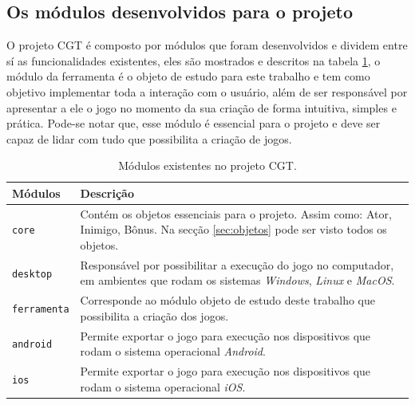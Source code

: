\documentclass[12pt,oneside,openright,a4paper,english,brazil,sumario=tradicional]{abntex2}
\begin{document}
\subsection{Os módulos desenvolvidos para o projeto}
O projeto CGT é composto por módulos que foram desenvolvidos e dividem entre sí as funcionalidades existentes, eles são mostrados e descritos na tabela \ref{table:modulos}, o módulo da ferramenta é o objeto de estudo para este trabalho e tem como objetivo implementar toda a interação com o usuário, além de ser responsável por apresentar a ele o jogo no momento da sua criação de forma intuitiva, simples e prática. Pode-se notar que, esse módulo é essencial para o projeto e deve ser capaz de lidar com tudo que possibilita a criação de jogos.
\begin{table}[h]
   \centering
   \begin{tabular}{ | l | p{10cm} | }
      \hline
      \textbf{Módulos} & \textbf{Descrição} \\
      \hline
      \texttt{core} & Contém os objetos essenciais para o projeto. Assim como: Ator, Inimigo, Bônus. Na secção \ref{sec:objetos} pode ser visto todos os objetos. \\
      \hline
      \texttt{desktop} & Responsável por possibilitar a execução do jogo no computador, em ambientes que rodam os sistemas \emph{Windows}, \emph{Linux} e \emph{MacOS}. \\
      \hline
      \texttt{ferramenta} & Corresponde ao módulo objeto de estudo deste trabalho que possibilita a criação dos jogos. \\
      \hline
      \texttt{android} & Permite exportar o jogo para execução nos dispositivos que rodam o sistema operacional \emph{Android}. \\
      \hline
      \texttt{ios} & Permite exportar o jogo para execução nos dispositivos que rodam o sistema operacional \emph{iOS}. \\
      \hline
   \end{tabular}
   \caption{Módulos existentes no projeto CGT.}
   \label{table:modulos}
\end{table}
\end{document}
